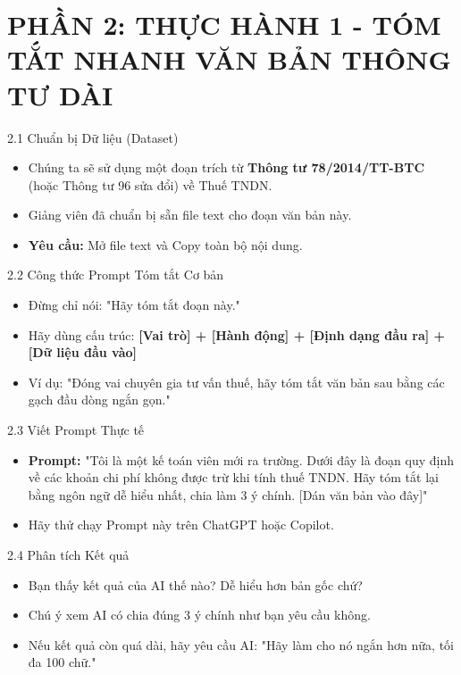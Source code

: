 \documentclass[aspectratio=169]{beamer}
\begin{document}
\section{PHẦN 2: THỰC HÀNH 1 - TÓM TẮT NHANH VĂN BẢN THÔNG TƯ DÀI}


\begin{frame}{2.1 Chuẩn bị Dữ liệu (Dataset)}
    \begin{itemize}
        \item Chúng ta sẽ sử dụng một đoạn trích từ \textbf{Thông tư 78/2014/TT-BTC} (hoặc Thông tư 96 sửa đổi) về Thuế TNDN.
        \item Giảng viên đã chuẩn bị sẵn file text cho đoạn văn bản này.
        \item \textbf{Yêu cầu:} Mở file text và Copy toàn bộ nội dung.
    \end{itemize}
\end{frame}


\begin{frame}{2.2 Công thức Prompt Tóm tắt Cơ bản}
    \begin{itemize}
        \item Đừng chỉ nói: "Hãy tóm tắt đoạn này."
        \item Hãy dùng cấu trúc: \textbf{[Vai trò] + [Hành động] + [Định dạng đầu ra] + [Dữ liệu đầu vào]}
        \item Ví dụ: "Đóng vai chuyên gia tư vấn thuế, hãy tóm tắt văn bản sau bằng các gạch đầu dòng ngắn gọn."
    \end{itemize}
\end{frame}


\begin{frame}{2.3 Viết Prompt Thực tế}
    \begin{itemize}
        \item \textbf{Prompt:} "Tôi là một kế toán viên mới ra trường. Dưới đây là đoạn quy định về các khoản chi phí không được trừ khi tính thuế TNDN. Hãy tóm tắt lại bằng ngôn ngữ dễ hiểu nhất, chia làm 3 ý chính. [Dán văn bản vào đây]"
        \item Hãy thử chạy Prompt này trên ChatGPT hoặc Copilot.
    \end{itemize}
\end{frame}


\begin{frame}{2.4 Phân tích Kết quả}
    \begin{itemize}
        \item Bạn thấy kết quả của AI thế nào? Dễ hiểu hơn bản gốc chứ?
        \item Chú ý xem AI có chia đúng 3 ý chính như bạn yêu cầu không.
        \item Nếu kết quả còn quá dài, hãy yêu cầu AI: "Hãy làm cho nó ngắn hơn nữa, tối đa 100 chữ."
    \end{itemize}
\end{frame}
\end{document}
